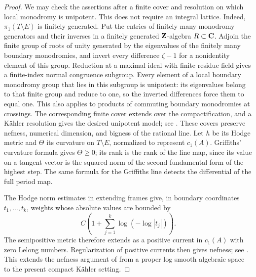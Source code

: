 \begin{proof}
We may check the assertions after a finite cover and resolution on
which local monodromy is unipotent.  This does not require an integral
lattice.  Indeed, $\pi_1(T\setminus E)$ is finitely generated.  Put
the entries of finitely many monodromy generators and their inverses
in a finitely generated $\mathbf Z$-algebra $R\subset\mathbf C$.  Adjoin the
finite group of roots of unity generated by the eigenvalues of the
finitely many boundary monodromies, and invert every difference
$\zeta-1$ for a nonidentity element of this group.  Reduction at a
maximal ideal with finite residue field gives a finite-index normal
congruence subgroup.  Every element of a local boundary monodromy
group that lies in this subgroup is unipotent: its eigenvalues
belong to that finite group and reduce to one, so the inverted
differences force them to equal one.  This also applies to products
of commuting boundary monodromies at crossings.  The corresponding finite cover extends
over the compactification, and a Kähler resolution gives the desired
unipotent model; see \cite[Lemma~2.21]{VilladsenHodgeKahler}.
These covers preserve nefness, numerical dimension, and bigness of
the rational line.  Let $h$ be its Hodge metric and $\Theta$ its curvature
on $T\setminus E$, normalized to represent $c_1(A)$.  Griffiths'
curvature formula gives $\Theta\geq0$; its rank is the rank of the
line map, since its value on a tangent vector is the squared norm of
the second fundamental form of the highest step.  The same formula
for the Griffiths line detects the differential of the full period
map.

The Hodge norm estimates in extending frames give, in boundary
coordinates $t_1,\ldots,t_k$, weights whose absolute values are bounded
by
\begin{equation}
\label{period:loglog}
              C\left(1+\sum_{j=1}^k
                   \log(-\log|t_j|)\right).
\end{equation}
The semipositive metric therefore extends as a positive current in
$c_1(A)$ with zero Lelong numbers.  Regularization of positive
currents then gives nefness; see
\cite[Corollary~6.4]{DemaillyRegularization}.
This extends the nefness argument of \cite[Lemma~2.16(1)]{BFMT}
from a proper log smooth algebraic space to the present compact
Kähler setting.


\end{proof}
